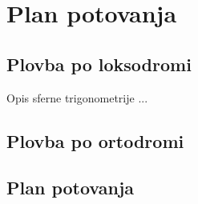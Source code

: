 \chapter{Plan potovanja}

\section{Plovba po loksodromi}
Opis sferne trigonometrije ...

\section{Plovba po ortodromi}

\section{Plan potovanja}